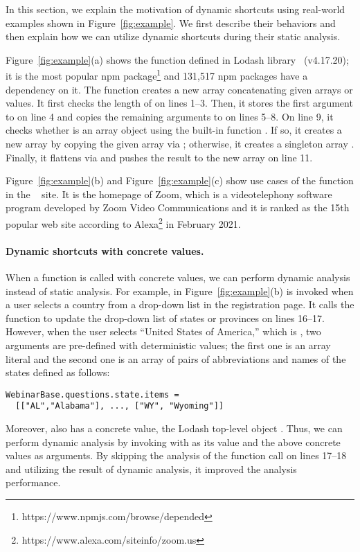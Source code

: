 In this section, we explain the motivation of dynamic shortcuts
using real-world examples shown in Figure~\ref{fig:example}.
We first describe their behaviors and then explain how we can utilize
dynamic shortcuts during their static analysis.

Figure~\ref{fig:example}(a) shows the  function defined
in Lodash library~\cite{lodash} (v4.17.20); it is
the most popular npm package\footnote{https://www.npmjs.com/browse/depended}
and 131,517 npm packages have a dependency on it.
The  function creates a new array concatenating given arrays or values.
It first checks the length of  on lines 1--3.
Then, it stores the first argument to  on line 4 and
copies the remaining arguments to  on lines 5--8.
On line 9, it checks whether  is an array object using
the built-in function .  If so, it creates a new array
by copying the given array via ; otherwise,
it creates a singleton array \jscode{[array]}.  Finally, it flattens
 via  and pushes the result to the
new array on line 11.

Figure~\ref{fig:example}(b) and Figure~\ref{fig:example}(c) show use
cases of the  function in the ~\cite{zoom} site.
It is the homepage of Zoom, which is a videotelephony software program developed by Zoom
Video Communications and it is ranked as the 15th popular web site according
to Alexa\footnote{https://www.alexa.com/siteinfo/zoom.us} in February 2021.

\paragraph{Dynamic shortcuts with concrete values.}
When a function is called with concrete values, we can perform
dynamic analysis instead of static analysis.
For example,  in Figure~\ref{fig:example}(b)
is invoked when a user selects a country from a drop-down list in the registration page.
It calls the  function to update the drop-down list of
states or provinces on lines 16--17.  However, when the user selects ``United States of America,''
which is , two arguments are pre-defined with
deterministic values; the first one is an array literal
 and the second one is an array of pairs
of abbreviations and names of the states defined as follows:
\begin{lstlisting}[style=myJSstyle,numbers=none]
WebinarBase.questions.state.items =
  [["AL","Alabama"], ..., ["WY", "Wyoming"]]
\end{lstlisting}
Moreover,  also has a concrete value, the Lodash top-level object \jscode{\_}.
Thus, we can perform dynamic analysis by invoking  with
\jscode{\_} as its  value and the above concrete values as arguments. 
By skipping the analysis of the function call on lines 17--18 and
utilizing the result of dynamic analysis, it improved the analysis performance.

